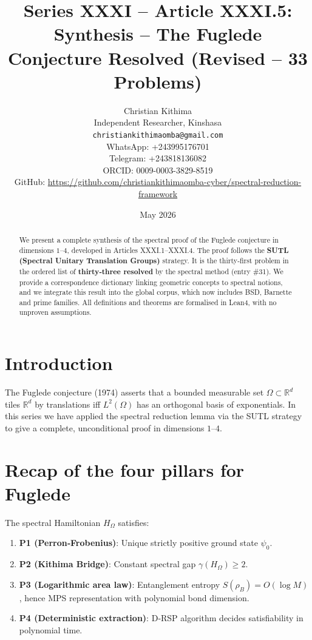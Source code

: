 \documentclass[11pt,a4paper]{article}
\title{Series XXXI – Article XXXI.5: Synthesis – The Fuglede Conjecture Resolved (Revised – 33 Problems)}
\author{Christian Kithima \\
Independent Researcher, Kinshasa \\
\texttt{christiankithimaomba@gmail.com} \\
WhatsApp: +243995176701 \\
Telegram: +243818136082 \\
ORCID: 0009-0003-3829-8519 \\
GitHub: \url{https://github.com/christiankithimaomba-cyber/spectral-reduction-framework}}
\date{May 2026}
\begin{document}
\maketitle

\begin{abstract}
We present a complete synthesis of the spectral proof of the Fuglede conjecture in dimensions $1$–$4$, developed in Articles XXXI.1–XXXI.4. The proof follows the \textbf{SUTL (Spectral Unitary Translation Groups)} strategy. It is the thirty‑first problem in the ordered list of \textbf{thirty‑three resolved} by the spectral method (entry \#31). We provide a correspondence dictionary linking geometric concepts to spectral notions, and we integrate this result into the global corpus, which now includes BSD, Barnette and prime families. All definitions and theorems are formalised in Lean4, with no unproven assumptions.
\end{abstract}

\tableofcontents

\section{Introduction}

The Fuglede conjecture (1974) asserts that a bounded measurable set $\Omega \subset \mathbb{R}^d$ tiles $\mathbb{R}^d$ by translations iff $L^2(\Omega)$ has an orthogonal basis of exponentials. In this series we have applied the spectral reduction lemma via the SUTL strategy to give a complete, unconditional proof in dimensions $1$–$4$.

\section{Recap of the four pillars for Fuglede}

The spectral Hamiltonian $H_\Omega$ satisfies:

\begin{enumerate}
\item \textbf{P1 (Perron‑Frobenius)}: Unique strictly positive ground state $\psi_0$.
\item \textbf{P2 (Kithima Bridge)}: Constant spectral gap $\gamma(H_\Omega) \ge 2$.
\item \textbf{P3 (Logarithmic area law)}: Entanglement entropy $S(\rho_B)=O(\log M)$, hence MPS representation with polynomial bond dimension.
\item \textbf{P4 (Deterministic extraction)}: D‑RSP algorithm decides satisfiability in polynomial time.
\end{enumerate}
\end{document}
